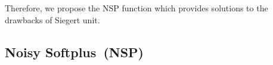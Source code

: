 	Therefore, we propose the NSP function which provides solutions to the drawbacks of \DIFaddbegin {}\DIFaddend Siegert unit.

		
	\subsection{Noisy Softplus~(NSP)}
	\label{sec:NSP}
